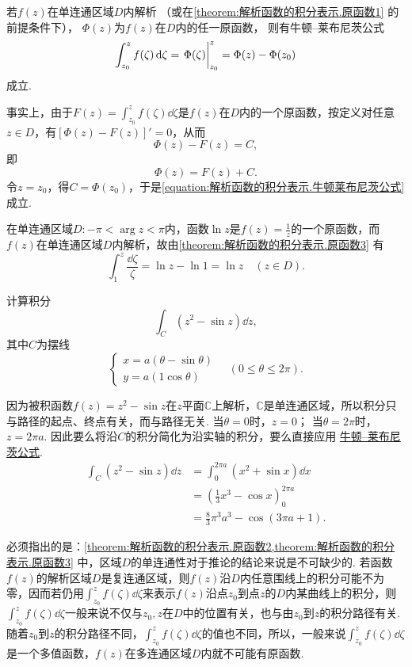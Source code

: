 \begin{corollary}\label{theorem:解析函数的积分表示.原函数3}
若\(f(z)\)在单连通区域\(D\)内解析
（或在\cref{theorem:解析函数的积分表示.原函数1} 的前提条件下），
\(\Phi(z)\)为\(f(z)\)在\(D\)内的任一原函数，
则有牛顿--莱布尼茨公式
\begin{equation}\label{equation:解析函数的积分表示.牛顿莱布尼茨公式}
\int_{z_0}^z f(\zeta) \dd{\zeta}
= \eval{\Phi(\zeta)}_{z_0}^z
= \Phi(z)-\Phi(z_0)
\end{equation}成立.
\end{corollary}
事实上，由于\(F(z) = \int_{z_0}^z f(\zeta) \dd{\zeta}\)是\(f(z)\)在\(D\)内的一个原函数，按定义对任意\(z \in D\)，有\([\Phi(z) - F(z)]'=0\)，从而\[
\Phi(z) - F(z) = C,
\]即\[
\Phi(z) = F(z) + C.
\]令\(z=z_0\)，得\(C = \Phi(z_0)\)，于是\cref{equation:解析函数的积分表示.牛顿莱布尼茨公式} 成立.

\begin{example}
在单连通区域\(D: -\pi<\arg z<\pi\)内，函数\(\ln z\)是\(f(z) = \frac{1}{z}\)的一个原函数，而\(f(z)\)在单连通区域\(D\)内解析，故由\cref{theorem:解析函数的积分表示.原函数3} 有\[
\int_1^z \frac{\dd{\zeta}}{\zeta}
= \ln z - \ln 1
= \ln z \quad(z \in D).
\]
\end{example}

\begin{example}
计算积分\[
	\int_C (z^2 - \sin z) \dd{z},
\]
其中\(C\)为摆线\[
	\left\{ \begin{array}{l}
	x = a(\theta-\sin\theta) \\
	y = a(1\cos\theta)
	\end{array} \right.
	\quad(0\leq\theta\leq2\pi).
\]
\begin{solution}
因为被积函数\(f(z) = z^2 - \sin z\)在\(z\)平面\(\mathbb{C}\)上解析，\(\mathbb{C}\)是单连通区域，所以积分只与路径的起点、终点有关，而与路径无关.
当\(\theta=0\)时，\(z=0\)；
当\(\theta=2\pi\)时，\(z=2\pi a\).
因此要么将沿\(C\)的积分简化为沿实轴的积分，要么直接应用%
\hyperref[equation:解析函数的积分表示.牛顿莱布尼茨公式]{牛顿--莱布尼茨公式}.
\begin{align*}
\int_C (z^2 - \sin z) \dd{z}
&= \int_0^{2\pi a} (x^2 + \sin x) \dd{x} \\
&= \left(\frac{1}{3} x^3 - \cos x\right)_0^{2\pi a} \\
&= \frac{8}{3} \pi^3 a^3 - \cos(3\pi a+1).
\end{align*}
\end{solution}
\end{example}

必须指出的是：\cref{theorem:解析函数的积分表示.原函数2,theorem:解析函数的积分表示.原函数3} 中，区域\(D\)的单连通性对于推论的结论来说是不可缺少的.
若函数\(f(z)\)的解析区域\(D\)是复连通区域，则\(f(z)\)沿\(D\)内任意围线上的积分可能不为零，因而若仍用\(\int_{z_0}^z f(\zeta) \dd{\zeta}\)来表示\(f(z)\)沿点\(z_0\)到点\(z\)的\(D\)内某曲线上的积分，则\(\int_{z_0}^z f(\zeta) \dd{\zeta}\)一般来说不仅与\(z_0,z\)在\(D\)中的位置有关，也与由\(z_0\)到\(z\)的积分路径有关.
随着\(z_0\)到\(z\)的积分路径不同，\(\int_{z_0}^z f(\zeta) \dd{\zeta}\)的值也不同，所以，一般来说\(\int_{z_0}^z f(\zeta) \dd{\zeta}\)是一个多值函数，\(f(z)\)在多连通区域\(D\)内就不可能有原函数.

